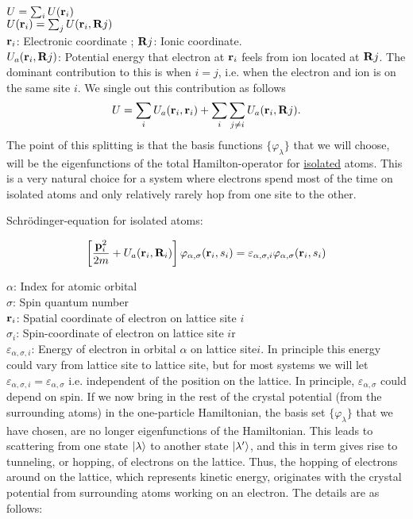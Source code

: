 \noindent $U= \sum_i U(\vb{r}_i) $ \\
\noindent $U(\vb{r}_i)= \sum_j U(\vb{r}_i, \vb{R}j)$\\
\noindent $\vb{r}_i$: Electronic coordinate ; $\vb{R}j$: Ionic coordinate.\\

\noindent $U_a(\vb{r}_i, \vb{R}j)$: Potential energy that electron at $\vb{r}_i$ feels from ion located at $\vb{R}j$. The dominant contribution to this is when $i=j$, i.e. when the electron and ion is on the same site $i$. We single out this contribution as follows
\begin{align*}
	U = \sum_i U_a(\vb{r}_i, \vb{r}_i) + \sum_i \sum_{j\neq i}  U_a(\vb{r}_i, \vb{R}j).
\end{align*}
\noindent The point of this splitting is that the basis functions $\{\varphi_\lambda \}$ that we will choose, will be the eigenfunctions of the total Hamilton-operator for \uline{isolated} atoms. This is a very natural choice for a system where electrons spend most of the time on isolated atoms and only relatively rarely hop from one site to the other.\newline

\noindent Schrödinger-equation for isolated atoms:

\begin{align*}
	\left[\frac{\vb{p}_i^2}{2m}+ U_a( \vb{r}_i, \vb{R}_i)\right] \varphi_{\alpha, \sigma}( \vb{r}_i, s_i)= \varepsilon_{\alpha,\sigma, i} \varphi_{\alpha, \sigma}( \vb{r}_i, s_i)
\end{align*}

\noindent $\alpha$: Index for atomic orbital \\
\noindent $\sigma$: Spin quantum number\\
\noindent $\vb{r}_i$: Spatial coordinate of electron on lattice site $i$\\
\noindent $\sigma_i$: Spin-coordinate of electron on lattice site $i$r\\
\noindent $\varepsilon_{\alpha,\sigma, i}$: Energy of electron in orbital $\alpha$ on lattice site$i$. In principle this energy could vary from lattice site to lattice site, but for most systems we will let $\varepsilon_{\alpha, \sigma, i} = \varepsilon_{\alpha, \sigma}$ i.e. independent of the position on the lattice. In principle, $\varepsilon_{\alpha, \sigma}$ could depend on spin. 
If we now bring in the rest of the crystal potential (from the surrounding atoms) in the one-particle Hamiltonian, the basis set $\{\varphi_\lambda \}$ that we have chosen, are no longer eigenfunctions of the Hamiltonian. This leads to scattering from one state $\ket{\lambda}$ to another state $\ket{\lambda'}$, and this in term gives rise to tunneling, or hopping, of electrons on the lattice. Thus, the hopping of electrons around on the lattice, which represents kinetic energy, originates with the crystal potential from surrounding atoms working on an electron. The details are as follows:

